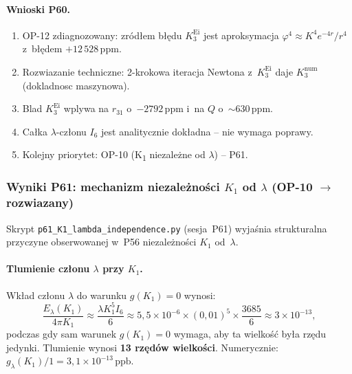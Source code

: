 \paragraph{Wnioski P60.}
\begin{enumerate}
  \item OP-12 zdiagnozowany: zr\'od\l{}em b\l{}\k{e}du $K_3^{\mathrm{Ei}}$
        jest aproksymacja $\varphi^4\approx K^4 e^{-4r}/r^4$
        z~b\l{}\k{e}dem $+12\,528\,\mathrm{ppm}$.
  \item Rozwiazanie techniczne: 2-krokowa iteracja Newtona
        z~$K_3^{\mathrm{Ei}}$ daje $K_3^{\mathrm{num}}$ (dokladnosc maszynowa).
  \item Blad $K_3^{\mathrm{Ei}}$ wplywa na $r_{31}$ o~$-2792\,\mathrm{ppm}$
        i~na $Q$ o~$\sim 630\,\mathrm{ppm}$.
  \item Ca\l{}ka $\lambda$-cz\l{}onu $I_6$ jest analitycznie dok\l{}adna --
        nie wymaga poprawy.
  \item Kolejny priorytet: OP-10 (K\textsubscript{1} niezale\.zne od $\lambda$) -- P61.
\end{enumerate}

\subsubsection{Wyniki P61: mechanizm niezale\.zno\'sci $K_1$ od $\lambda$ (OP-10 $\to$ rozwiazany)}%
\label{app:F-P61}

Skrypt \texttt{p61\_K1\_lambda\_independence.py} (sesja~P61)
wyja\'snia strukturalna przyczyne obserwowanej w~P56 niezale\.zno\'sci
$K_1$ od~$\lambda$.

\paragraph{Tlumienie cz\l{}onu $\lambda$ przy $K_1$.}
Wk\l{}ad cz\l{}onu $\lambda$ do warunku $g(K_1)=0$ wynosi:
\begin{equation}
  \frac{E_\lambda(K_1)}{4\pi K_1}
  \approx \frac{\lambda K_1^5 I_6}{6}
  \approx 5{,}5\times10^{-6}\times(0{,}01)^5\times\frac{3685}{6}
  \approx 3\times10^{-13},
  \label{eq:K1-lam-suppression}
\end{equation}
podczas gdy sam warunek $g(K_1)=0$ wymaga, aby ta wielko\'s\'c
by\l{}a rz\k{e}du jedynki.
Tlumienie wynosi \textbf{13 rz\k{e}d\'ow wielko\'sci}.
Numerycznie: $g_\lambda(K_1)/1 = 3{,}1\times10^{-13}\,\mathrm{ppb}$.

